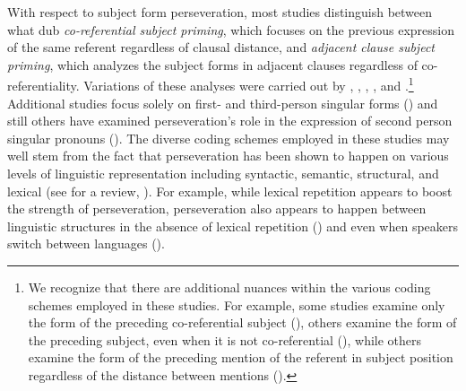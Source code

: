 \documentclass[output=paper]{langscibook}
\begin{document}
With respect to subject form perseveration, most studies distinguish between what \citet{TravisCacoullos2018} dub \textit{co-referential subject priming}, which focuses on the previous expression of the same referent regardless of clausal distance, and \textit{adjacent clause subject priming}, which analyzes the subject forms in adjacent clauses regardless of co-referentiality. Variations of these analyses were carried out by \citet{TorresTravis2010}, \citet{CarvalhoChild2011}, \citet{Abreu2012}, \citet{Flores-Ferrán2002}, \citet{GeeslinGudmestad2011} and \citet{Travis2007}.\footnote{We recognize that there are additional nuances within the various coding schemes employed in these studies. For example, some studies examine only the form of the preceding co-referential subject (\citealt{CarvalhoChild2011, TorresTravis2010}), others examine the form of the preceding subject, even when it is not co-referential (\citealt{Cameron1994, CameronFlores-Ferrán2004}), while others examine the form of the preceding mention of the referent in subject position regardless of the distance between mentions (\citealt{Abreu2012, Flores-Ferrán2002, GeeslinGudmestad2011, Travis2007}).} Additional studies focus solely on first- and third-person singular forms (\citealt{dePradaPérez2020}) and still others have examined perseveration’s role in the expression of second person singular pronouns (\citealt{CallaghanTravis2021}). The diverse coding schemes employed in these studies may well stem from the fact that perseveration has been shown to happen on various levels of linguistic representation including syntactic, semantic, structural, and lexical (see \citealt{PickeringFerreira2008} for a review, \citealt{Travis2007}). For example, while lexical repetition appears to boost the strength of perseveration, perseveration also appears to happen between linguistic structures in the absence of lexical repetition (\citealt{PickeringFerreira2008, Travis2007}) and even when speakers switch between languages (\citealt{dePradaPérez2018, GriesKootstra2017, Sodaci2018, TorresTravis2010}).
\end{document}
